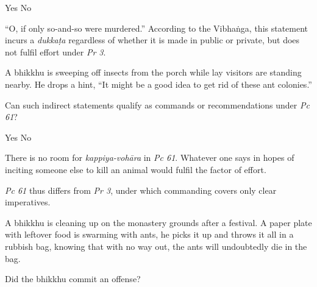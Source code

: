 \begin{exam}{\autoExamName}
\begin{problem}
  \bigskip

  \begin{answers}{2}
    \bChoices
     Yes\eAns
     No\eAns
    \eChoices
  \end{answers}

  \begin{solution}
    ``O, if only so-and-so were murdered.'' According to the Vibhaṅga, this statement incurs a \emph{dukkaṭa} regardless of whether it is made in public or private, but does not fulfil effort under \emph{Pr 3}.
  \end{solution}

\end{problem}

\problemDivide

\begin{problem}

  A bhikkhu is sweeping off insects from the porch while lay visitors are standing nearby.
  He drops a hint, ``It might be a good idea to get rid of these ant colonies.''

  Can such indirect statements qualify as commands or recommendations under \emph{Pc 61}?

  \bigskip

  \begin{answers}{2}
    \bChoices
     Yes\eAns
     No\eAns
    \eChoices
  \end{answers}

  \begin{solution}
    There is no room for \emph{kappiya-vohāra} in \emph{Pc 61}. Whatever one says in hopes of inciting someone else to kill an animal would fulfil the factor of effort.

    \emph{Pc 61} thus differs from \emph{Pr 3}, under which commanding covers only clear imperatives.
  \end{solution}

\end{problem}

\ifnosolutions
\clearpage
\else
\problemDivide
\fi

\begin{problem}

  A bhikkhu is cleaning up on the monastery grounds after a festival.
  A paper plate with leftover food is swarming with ants, he picks it up and throws it all in a rubbish bag,
  knowing that with no way out, the ants will undoubtedly die in the bag.

  Did the bhikkhu commit an offense?


\end{problem}
\end{exam}
